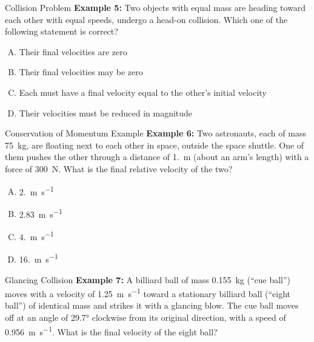 \documentclass[12pt,compress,aspectratio=169]{beamer}
\begin{document}
\begin{frame}{Collision Problem}
  \textbf{Example 5:} Two objects with equal mass are heading toward each
  other with equal speeds, undergo a head-on collision. Which one of the
  following statement is correct?

  \vspace{.15in}\begin{enumerate}[A.]
  \item Their final velocities are zero
  \item Their final velocities may be zero
  \item Each must have a final velocity equal to the other's initial velocity
  \item Their velocities must be reduced in magnitude
  \end{enumerate}
\end{frame}



\begin{frame}{Conservation of Momentum Example}
  \textbf{Example 6:} Two astronauts, each of mass \SI{75}{\kilo\gram}, are
  floating next to each other in space, outside the space shuttle. One of them
  pushes the other through a distance of \SI{1.}{\metre} (about an arm's
  length) with a force of \SI{300}{\newton}. What is the final relative
  velocity of the two?

  \vspace{.15in}\begin{enumerate}[A.]
  \item \SI{2.}{\metre\per\second}
  \item \SI{2.83}{\metre\per\second}
  \item \SI{4.}{\metre\per\second}
  \item \SI{16.}{\metre\per\second}
  \end{enumerate}
\end{frame}



\begin{frame}{Glancing Collision}
  \vspace{.3in}\textbf{Example 7:} A billiard ball of mass \SI{.155}{\kilo\gram}
  (``cue ball'') moves with a velocity of \SI{1.25}{\metre\per\second} toward
  a stationary billiard ball (``eight ball'') of identical mass and strikes it
  with a glancing blow. The cue ball moves off at an angle of \ang{29.7}
  clockwise from its original direction, with a speed of
  \SI{.956}{\metre\per\second}. What is the final velocity of the eight ball?
\end{frame}
\end{document}
